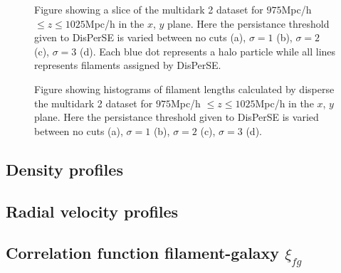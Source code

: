 \begin{figure}[htbp]
    \hspace{1em}%
    \hspace{1em}%
    \caption{Figure showing a slice of the multidark 2 dataset for $975$Mpc/h $\leq z\leq1025$Mpc/h in the $x$, $y$ plane. Here the persistance threshold given to DisPerSE is varied between no cuts (a), $\sigma=1$ (b), $\sigma=2$ (c), $\sigma=3$ (d). Each blue dot represents a halo particle while all lines represents filaments assigned by DisPerSE.}
\end{figure}
\begin{figure}[htbp]
    \hspace{1em}%
    \hspace{1em}%
    \caption{Figure showing histograms of filament lengths calculated by disperse the multidark 2 dataset for $975$Mpc/h $\leq z\leq1025$Mpc/h in the $x$, $y$ plane. Here the persistance threshold given to DisPerSE is varied between no cuts (a), $\sigma=1$ (b), $\sigma=2$ (c), $\sigma=3$ (d).}
\end{figure}
\subsection{Density profiles}
\subsection{Radial velocity profiles}
\subsection{Correlation function filament-galaxy $\xi_{fg}$}
